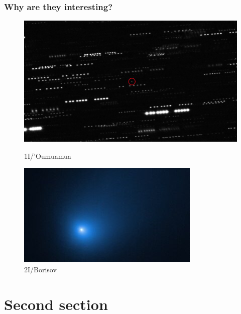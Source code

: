 \documentclass[xcolor={dvipsnames}]{beamer}
\begin{document}
\begin{frame}
\frametitle{Why are they interesting?}

\begin{figure}
    \centering
    \begin{minipage}{0.45\textwidth}
        \centering
        \includegraphics[width=\textwidth]{fig/static/oumuamua/shape.png}
        \caption{1I/'Oumuamua}
        \label{fig:figure1}
    \end{minipage}
    \hfill
    \begin{minipage}{0.45\textwidth}
        \centering
        \includegraphics[width=\textwidth]{fig/static/borisov/shape.jpg}
        \caption{2I/Borisov}
        \label{fig:figure2}
    \end{minipage}
\end{figure}


\end{frame}

\section{Second section}
\end{document}
